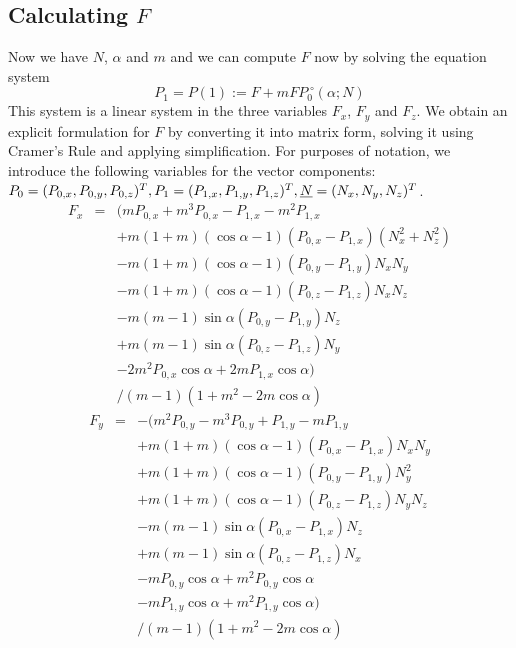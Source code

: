 \documentclass[journal, letterpaper]{IEEEtran}
\begin{document}
\subsection{Calculating $F$}
Now we have $N$, $\alpha$ and $m$ and we can compute $F$ now by solving the equation system
\begin{equation}
 P_1 = P(1) := F + m FP_0 ^{\;\circ} (\alpha; N)
\label{eq:Feq}
\end{equation}
This system is a linear system in the three variables $F_x$, $F_y$ and $F_z$. We obtain an explicit formulation for $F$ by converting it into matrix form, solving it using Cramer's Rule and applying simplification. For purposes of notation, we introduce the following variables for the vector components: $P_0=(P_{0,x},P_{0,y},P_{0,z})^T, P_1=(P_{1,x},P_{1,y},P_{1,z})^T,\\ \underline{N}=(N_x,N_y,N_z)^T$.
\begin{equation}
\begin{array}{lcl}
	F_x &=& (m P_{0,x} + m^3 P_{0,x} - P_{1,x} - m^2 P_{1,x} \\
		&& + m (1+m) (\cos\alpha - 1) (P_{0,x} - P_{1,x}) (N_x^2 + N_z^2) \\
		&& - m (1+m) (\cos\alpha - 1) (P_{0,y} - P_{1,y}) N_x N_y \\
		&& - m (1+m) (\cos\alpha - 1) (P_{0,z} - P_{1,z}) N_x N_z \\
		&& - m (m-1) \sin\alpha (P_{0,y} - P_{1,y}) N_z \\
		&& + m (m-1) \sin\alpha (P_{0,z} - P_{1,z}) N_y \\
		&& - 2 m^2 P_{0,x} \cos\alpha + 2 m P_{1,x} \cos\alpha ) \\
		&& / (m-1)(1 + m^2 - 2m\cos\alpha)
\end{array}
\end{equation}
\begin{equation}
\begin{array}{lcl}
 F_y &=& -(m^2 P_{0,y} - m^3 P_{0,y} + P_{1,y} - m P_{1,y} \\
		&& + m (1+m) (\cos\alpha - 1) (P_{0,x} - P_{1,x}) N_x N_y \\
		&& + m (1+m) (\cos\alpha - 1) (P_{0,y} - P_{1,y}) N_y^2 \\
		&& + m (1+m) (\cos\alpha - 1) (P_{0,z} - P_{1,z}) N_y N_z \\
		&& - m (m-1) \sin\alpha (P_{0,x} - P_{1,x}) N_z \\
		&& + m (m-1) \sin\alpha (P_{0,z} - P_{1,z}) N_x \\
		&& - m P_{0,y} \cos\alpha + m^2 P_{0,y} \cos\alpha \\
		&& - m P_{1,y} \cos\alpha + m^2 P_{1,y} \cos\alpha) \\
		&& / (m-1)(1 + m^2 - 2m\cos\alpha)
\end{array}
\label{eq:}
\end{equation}
\end{document}
